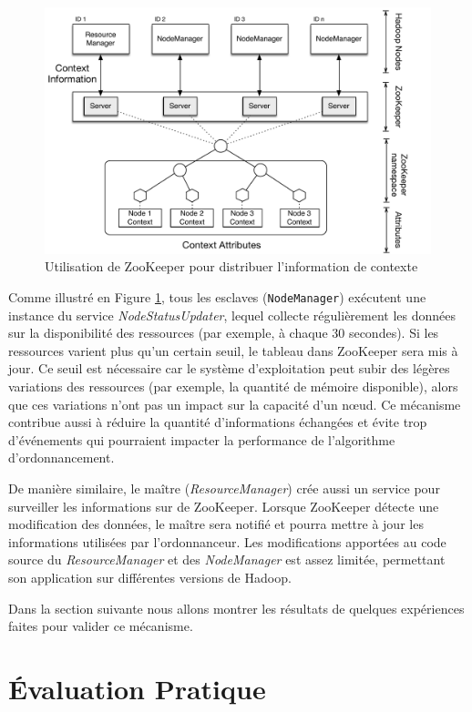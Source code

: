 \begin{figure}
	\centering
	\includegraphics[width=1\linewidth]{img/Zookeeper} 
	\caption{Utilisation de ZooKeeper pour distribuer l'information de contexte\label{fig:zookeeper}}
\end{figure}


Comme illustré en Figure \ref{fig:zookeeper}, tous les esclaves (\texttt{NodeManager}) exécutent une instance du service \textit{NodeStatusUpdater}, lequel collecte régulièrement les données sur la disponibilité des ressources (par exemple, à chaque 30 secondes). Si les ressources varient plus qu'un certain seuil, le tableau dans ZooKeeper sera mis à jour. Ce seuil est nécessaire car le système d'exploitation peut subir des légères variations des ressources (par exemple, la quantité de mémoire disponible), alors que ces variations n'ont pas un impact sur la capacité d'un n{\oe}ud. Ce mécanisme contribue aussi à réduire la quantité d'informations échangées et évite trop d'événements qui pourraient impacter la performance de l'algorithme d'ordonnancement. 

De manière similaire, le maître (\textit{ResourceManager}) crée aussi un service pour surveiller les informations sur de ZooKeeper. Lorsque ZooKeeper détecte une modification des données, le maître sera notifié et pourra mettre à jour les informations utilisées par l'ordonnanceur. Les modifications apportées au code source du \textit{ResourceManager} et des \textit{NodeManager} est assez limitée, permettant son application sur différentes versions de Hadoop.

Dans la section suivante nous allons montrer les résultats de quelques expériences faites pour valider ce mécanisme.


\section{Évaluation Pratique} \label{sec:exper}

